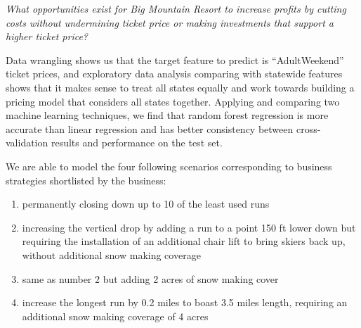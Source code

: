 \documentclass[11pt]{article}
\begin{document}
\begin{flushleft}
{\em What opportunities exist for Big Mountain Resort to increase profits by
cutting costs without undermining ticket price or making investments that
support a higher ticket price?}
\end{flushleft}

Data wrangling shows us that the target feature to predict is ``AdultWeekend''
ticket prices, and exploratory data analysis comparing with statewide features
shows that it makes sense to treat all states equally and work towards
building a pricing model that considers all states together. Applying and
comparing two machine learning techniques, we find that random forest
regression is more accurate than linear regression and has better consistency
between cross-validation results and performance on the test set.

We are able to model the four following scenarios corresponding to business
strategies shortlisted by the business:
\begin{enumerate}
\item permanently closing down up to 10 of the least used runs
\item increasing the vertical drop by adding a run to a point 150 ft lower down
but requiring the installation of an additional chair lift to bring skiers
back up, without additional snow making coverage
\item same as number 2 but adding 2 acres of snow making cover
\item increase the longest run by 0.2 miles to boast 3.5 miles length,
requiring an additional snow making coverage of 4 acres
\end{enumerate}
\end{document}
